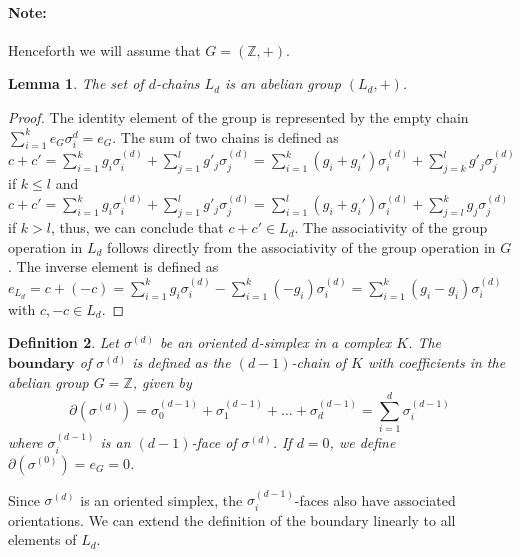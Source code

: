 \documentclass{article}
\newtheorem{definition}{Definition}[section]
\newtheorem{lemma}[definition]{Lemma}
\begin{document}
\paragraph{Note:} Henceforth we will assume that $G = (\mathbb{Z},+)$.

\begin{lemma}
The set of $d$-chains $L_d$ is an abelian group $(L_d,+)$.
\end{lemma}
\begin{proof}
The identity element of the group is represented by the empty chain $\sum_{i=1}^{k} e_G \sigma^{d}_i = e_G$. The sum of two chains is defined as $c+c' = \sum_{i=1}^{k} g_i \sigma_i^{(d)} + \sum_{j=1}^{l} g'_j \sigma_j^{(d)} = \sum_{i=1}^{k} (g_i+g_i') \sigma_i^{(d)} + \sum_{j=k}^{l} g'_j \sigma_j^{(d)}$ if $k \leq l$ and $c+c' = \sum_{i=1}^{k} g_i \sigma_i^{(d)} + \sum_{j=1}^{l} g'_j \sigma_j^{(d)} = \sum_{i=1}^{l} (g_i+g_i') \sigma_i^{(d)} + \sum_{j=l}^{k} g_j \sigma_j^{(d)}$ if $k > l$, thus, we can conclude that $c+c' \in L_d$. The associativity of the group operation in $L_d$ follows directly from the associativity of the group operation in $G$. The inverse element is defined as $e_{L_d} = c + (-c) = \sum_{i=1}^{k} g_i \sigma_i^{(d)} - \sum_{i=1}^{k} (-g_i) \sigma_i^{(d)} = \sum_{i=1}^{k} (g_i-g_i) \sigma_i^{(d)}$ with $c,-c \in L_d$.
\end{proof}

\begin{definition}
Let $\sigma^{(d)}$ be an oriented $d$-simplex in a complex $K$. The $\textbf{boundary}$ of $\sigma^{(d)}$ is defined as the $(d-1)$-chain of $K$ with coefficients in the abelian group $G = \mathbb{Z}$, given by
\begin{equation}
\partial(\sigma^{(d)}) = \sigma^{(d-1)}_0 + \sigma^{(d-1)}_1 + \ldots + \sigma^{(d-1)}_d = \sum_{i=1}^{d} \sigma^{(d-1)}_i
\end{equation}
where $\sigma^{(d-1)}_i$ is an $(d-1)$-face of $\sigma^{(d)}$. If $d=0$, we define $\partial(\sigma^{(0)}) = e_G = 0$.
\end{definition}

Since $\sigma^{(d)}$ is an oriented simplex, the $\sigma^{(d-1)}_i$-faces also have associated orientations. We can extend the definition of the boundary linearly to all elements of $L_d$.
\end{document}
